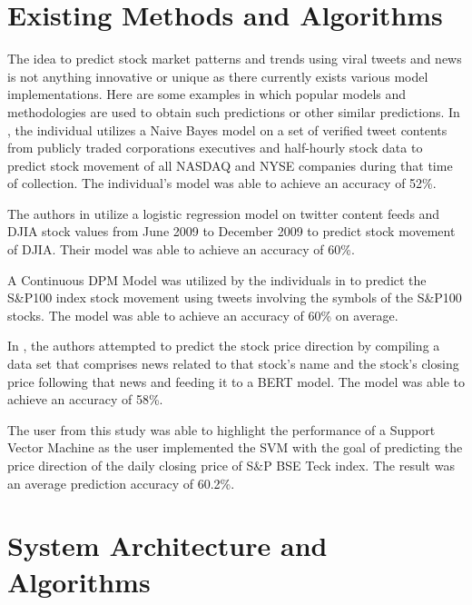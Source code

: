 \documentclass[conference]{IEEEtran}
\begin{document}
\section{Existing Methods and Algorithms}
The idea to predict stock market patterns and trends using viral tweets and news is not anything innovative or unique as there currently exists various model implementations. Here are some examples in which popular models and methodologies are used to obtain such predictions or other similar predictions.
In \cite{b10}, the individual utilizes a Naive Bayes model on a set of verified tweet contents from publicly traded corporations executives and half-hourly stock data to predict stock movement of all NASDAQ and NYSE companies during that time of collection. The individual’s model was able to achieve an accuracy of 52\%.

The authors in \cite{b1} utilize a logistic regression model on twitter content feeds and DJIA stock values from June 2009 to December 2009 to predict stock movement of DJIA. Their model was able to achieve an accuracy of 60\%.

A Continuous DPM Model was utilized by the individuals in \cite{b9} to predict the S\&P100 index stock movement using tweets involving the symbols of the S\&P100 stocks. The model was able to achieve an accuracy of 60\% on average.

In \cite{b15}, the authors attempted to predict the stock price direction by compiling a data set that comprises news related to that stock’s name and the stock’s closing price following that news and feeding it to a BERT model. The model was able to achieve an accuracy of 58\%.

The user from this study \cite{b14} was able to highlight the performance of a Support Vector Machine as the user implemented the SVM with the goal of predicting the price direction of the daily closing price of S\&P BSE Teck index. The result was an average prediction accuracy of 60.2\%. 

\section{System Architecture and Algorithms}
\end{document}
